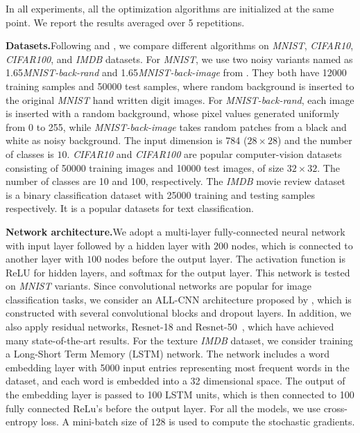\documentclass[11pt]{article}
\theoremstyle{k}
\begin{document}
In all experiments, all the optimization algorithms are initialized at the same point. We report the results averaged over 5 repetitions.

\textbf{Datasets.}\hspace{0.1in}Following \cite{RKK18} and \cite{KB15}, we compare different algorithms on \textit{MNIST}, \textit{CIFAR10},
\textit{CIFAR100}, and \textit{IMDB} datasets. 
For \textit{MNIST}, we use two noisy variants named as 1.65\textit{MNIST-back-rand} and 1.65\textit{MNIST-back-image} from \cite{MNIST07}. They both have 12000 training samples and 50000 test samples, where random background is inserted to the original \textit{MNIST} hand written 
digit images. For \textit{MNIST-back-rand}, each image is inserted with a random background, whose pixel values generated uniformly from 0 to 255, while \textit{MNIST-back-image} takes random patches from a black and white as noisy background.
The input dimension is 784 ($28\times 28$) and the number of classes is $10$. \textit{CIFAR10} and \textit{CIFAR100} are popular computer-vision datasets consisting of 50000 training images and 10000 test images, of size $32\times 32$. The number of classes are 10 and 100, respectively. The \textit{IMDB} movie review dataset is a binary classification dataset with 25000 training and testing samples respectively. It is a popular datasets for text classification.

\textbf{Network architecture.}\hspace{0.1in}We adopt a multi-layer fully-connected neural network with input layer followed by a hidden layer with $200$ nodes, which is connected to another layer with $100$ nodes before the output layer. The activation function is ReLU for hidden layers, and softmax for the output layer. This network is tested on \textit{MNIST} variants. Since convolutional networks are popular for image classification tasks, we consider an ALL-CNN architecture proposed by \cite{CNN15}, which is constructed with several convolutional blocks and dropout layers. In addition, we also apply residual networks, Resnet-18 and Resnet-50~\cite{Rnet16}, which have achieved many state-of-the-art results. For the texture \textit{IMDB} dataset, we consider training a Long-Short Term Memory (LSTM) network. The network includes a word embedding layer with 5000 input entries representing most frequent words in the dataset, and each word is embedded into a 32 dimensional space. The output of the embedding layer is passed to 100 LSTM units, which is then connected to 100 fully connected ReLu's before the output layer. For all the models, we use cross-entropy loss. A mini-batch size of $128$ is used to compute the stochastic gradients.
\end{document}
